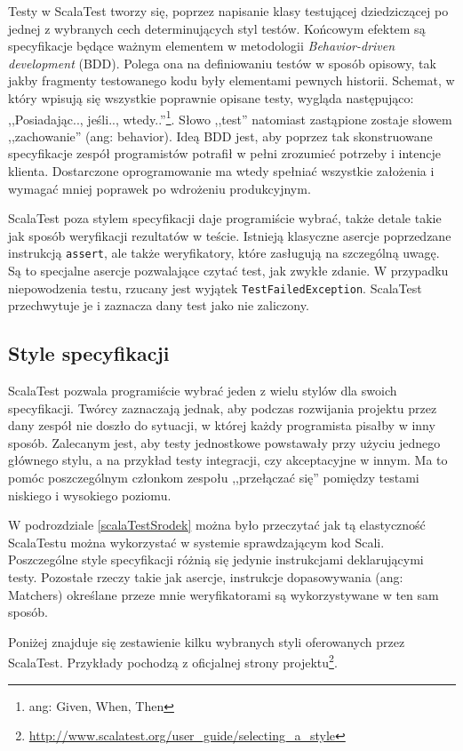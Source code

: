 \documentclass[brudnopis]{xmgr}
\begin{document}
Testy w ScalaTest tworzy się, poprzez napisanie klasy testującej dziedziczącej po jednej z wybranych cech determinujących styl testów. Końcowym efektem są specyfikacje będące ważnym elementem w metodologii \emph{Behavior-driven development} (BDD). Polega ona na definiowaniu testów w sposób opisowy, tak jakby fragmenty testowanego kodu były elementami pewnych historii. Schemat, w który wpisują się wszystkie poprawnie opisane testy, wygląda następująco: ,,Posiadając.., jeśli.., wtedy..''\footnote{ang: Given, When, Then}. Słowo ,,test'' natomiast zastąpione zostaje słowem ,,zachowanie'' (ang: behavior). Ideą BDD jest, aby poprzez tak skonstruowane specyfikacje zespół programistów potrafił w pełni zrozumieć potrzeby i intencje klienta. Dostarczone oprogramowanie ma wtedy spełniać wszystkie założenia i wymagać mniej poprawek po wdrożeniu produkcyjnym.

ScalaTest poza stylem specyfikacji daje programiście wybrać, także detale takie jak sposób weryfikacji rezultatów w teście. Istnieją klasyczne asercje poprzedzane instrukcją \texttt{assert}, ale także weryfikatory, które zasługują na szczególną uwagę. Są to specjalne asercje pozwalające czytać test, jak zwykłe zdanie. W przypadku niepowodzenia testu, rzucany jest wyjątek \texttt{TestFailedException}. ScalaTest przechwytuje je i zaznacza dany test jako nie zaliczony.

\subsection{Style specyfikacji}

ScalaTest pozwala programiście wybrać jeden z wielu stylów dla swoich specyfikacji. Twórcy zaznaczają jednak, aby podczas rozwijania projektu przez dany zespół nie doszło do sytuacji, w której każdy programista pisałby w inny sposób. Zalecanym jest, aby testy jednostkowe powstawały przy użyciu jednego głównego stylu, a na przykład testy integracji, czy akceptacyjne w innym. Ma to pomóc poszczególnym członkom zespołu ,,przełączać się'' pomiędzy testami niskiego i wysokiego poziomu.

W podrozdziale \ref{scalaTestSrodek} można było przeczytać jak tą elastyczność ScalaTestu można wykorzystać w systemie sprawdzającym kod Scali. Poszczególne style specyfikacji różnią się jedynie instrukcjami deklarującymi testy. Pozostałe rzeczy takie jak asercje, instrukcje dopasowywania (ang: Matchers) określane przeze mnie weryfikatorami są wykorzystywane w ten sam sposób.

Poniżej znajduje się zestawienie kilku wybranych styli oferowanych przez ScalaTest. Przykłady pochodzą z oficjalnej strony projektu\footnote{\url{http://www.scalatest.org/user_guide/selecting_a_style}}.
\end{document}
